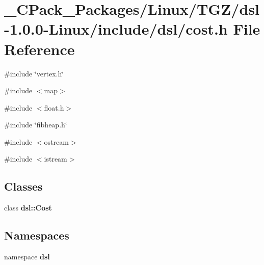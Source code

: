 \section{\_\-CPack\_\-Packages/Linux/TGZ/dsl-\/1.0.0-\/Linux/include/dsl/cost.h File Reference}
\label{__CPack__Packages_2Linux_2TGZ_2dsl-1_80_80-Linux_2include_2dsl_2cost_8h}
{\ttfamily \#include \char`\"{}vertex.h\char`\"{}}\par
{\ttfamily \#include $<$map$>$}\par
{\ttfamily \#include $<$float.h$>$}\par
{\ttfamily \#include \char`\"{}fibheap.h\char`\"{}}\par
{\ttfamily \#include $<$ostream$>$}\par
{\ttfamily \#include $<$istream$>$}\par
\subsection*{Classes}
\begin{DoxyCompactItemize}
\item 
class {\bf dsl::Cost}
\end{DoxyCompactItemize}
\subsection*{Namespaces}
\begin{DoxyCompactItemize}
\item 
namespace {\bf dsl}
\end{DoxyCompactItemize}
